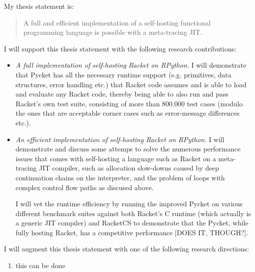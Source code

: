 My thesis statement is:

\begin{quote}
  A full and efficient implementation of a self-hosting functional
  programming language is possible with a meta-tracing JIT.
\end{quote}

I will support this thesis statement with the following research
contributions:

\begin{itemize}
  \item \textit{A full implementation of self-hosting Racket on
    RPython.} I will demonstrate that Pycket has all the necessary
    runtime support (e.g. primitives, data structures, error handling
    etc.)  that Racket code assumes and is able to load and evaluate
    any Racket code, thereby being able to also run and pass Racket's
    own test suite, consisting of more than 800.000 test cases (modulo
    the ones that are acceptable corner cases such as error-message
    differences etc.).
  \item \textit{An efficient implementation of self-hosting Racket on
    RPython.} I will demonstrate and discuss some attemps to solve the
    numerous performance issues that comes with self-hosting a
    language such as Racket on a meta-tracing JIT compiler, such as
    allocation slow-downs caused by deep continuation chains on the
    interpreter, and the problem of loops with complex control flow
    paths as discused above.


    I will vet the runtime efficiency by running the improved Pycket
    on various different benchmark suites against both Racket's C
    runtime (which actually is a generic JIT compiler) and RacketCS to
    demonstrate that the Pycket, while fully hosting Racket, has a
    competitive performance [DOES IT, THOUGH?].
\end{itemize}

I will augment this thesis statement with one of the following research directions:

\begin{enumerate}
  \item this can be done
\end{enumerate}
